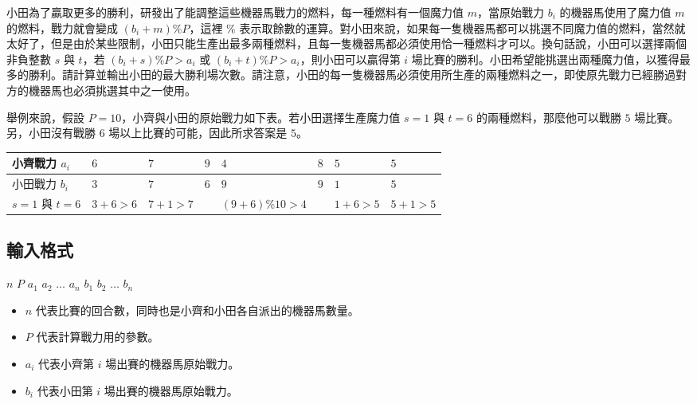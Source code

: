 小田為了贏取更多的勝利，研發出了能調整這些機器馬戰力的燃料，每一種燃料有一個魔力值
\(m\)，當原始戰力 \(b_i\) 的機器馬使用了魔力值 \(m\)
的燃料，戰力就會變成 \((b_i + m) \% P\)，這裡 \(\%\)
表示取餘數的運算。對小田來說，如果每一隻機器馬都可以挑選不同魔力值的燃料，當然就太好了，但是由於某些限制，小田只能生產出最多兩種燃料，且每一隻機器馬都必須使用恰一種燃料才可以。換句話說，小田可以選擇兩個非負整數
\(s\) 與 \(t\)，若 \((b_i + s) \% P > a_i\) 或
\((b_i + t) \% P > a_i\)，則小田可以贏得第 \(i\)
場比賽的勝利。小田希望能挑選出兩種魔力值，以獲得最多的勝利。請計算並輸出小田的最大勝利場次數。請注意，小田的每一隻機器馬必須使用所生產的兩種燃料之一，即使原先戰力已經勝過對方的機器馬也必須挑選其中之一使用。

舉例來說，假設
\(P=10\)，小齊與小田的原始戰力如下表。若小田選擇生產魔力值 \(s=1\) 與
\(t=6\) 的兩種燃料，那麼他可以戰勝 \(5\) 場比賽。另，小田沒有戰勝 \(6\)
場以上比賽的可能，因此所求答案是 \(5\)。

\begin{center}
\begin{tabular}{|l|l|l|l|l|l|l|l|}
\hline
小齊戰力 $a_i$ & $6$ & $7$ & $9$ & $4$ & $8$ & $5$ & $5$ \\
\hline
小田戰力 $b_i$ & $3$ & $7$ & $6$ & $9$ & $9$ & $1$ & $5$ \\
\hline
$s=1$ 與 $t=6$ & $3 + 6 > 6$ & $7 + 1 > 7$ & & $(9 + 6) \% 10 > 4$ & & $1 + 6 > 5$ & $5 + 1 > 5$ \\
\hline
\end{tabular}
\end{center}

\subsection{輸入格式}

\begin{format}
\f{
$n$ $P$
$a_1$ $a_2$ $\ldots$ $a_n$
$b_1$ $b_2$ $\ldots$ $b_n$
}
\end{format}

\begin{itemize}
\tightlist
\item
  \(n\) 代表比賽的回合數，同時也是小齊和小田各自派出的機器馬數量。
\item
  \(P\) 代表計算戰力用的參數。
\item
  \(a_i\) 代表小齊第 \(i\) 場出賽的機器馬原始戰力。
\item
  \(b_i\) 代表小田第 \(i\) 場出賽的機器馬原始戰力。
\end{itemize}


